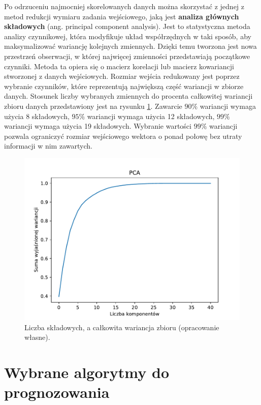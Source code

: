 \documentclass[a4paper, twoside, 11pt, openright]{article}
\begin{document}
Po odrzuceniu najmocniej skorelowanych danych można skorzystać z jednej z metod redukcji wymiaru zadania wejściowego, jaką jest \textbf{analiza głównych składowych} (ang. principal component analysis). Jest to statystyczna metoda analizy czynnikowej, która modyfikuje układ współrzędnych w taki sposób, aby maksymalizować wariancję kolejnych zmiennych. Dzięki temu tworzona jest nowa przestrzeń obserwacji, w której najwięcej zmienności przedstawiają początkowe czynniki. Metoda ta opiera się o macierz korelacji lub macierz kowariancji stworzonej z danych wejściowych. Rozmiar wejścia redukowany jest poprzez wybranie czynników, które reprezentują największą część wariancji w zbiorze danych. Stosunek liczby wybranych zmiennych do procenta całkowitej wariancji zbioru danych przedstawiony jest na rysunku \ref{img:pca_variance}. Zawarcie $90\%$ wariancji wymaga użycia 8 składowych,  $95\%$ wariancji wymaga użycia 12 składowych, $99\%$ wariancji wymaga użycia 19 składowych. Wybranie wartości $99\%$ wariancji pozwala ograniczyć rozmiar wejściowego wektora o ponad połowę bez utraty informacji w nim zawartych.

\begin{figure}[H]
\centering 
\includegraphics[scale=0.9]{img/pca_variance.pdf}
\caption{Liczba składowych, a całkowita wariancja zbioru (opracowanie własne).}
\label{img:pca_variance}
\end{figure}

\newpage

\section{Wybrane algorytmy do prognozowania}
\end{document}
